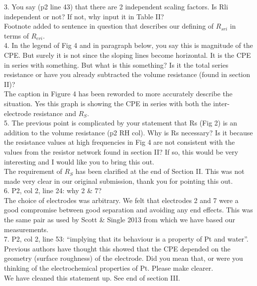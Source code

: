 \documentclass[journal, a4paper]{IEEEtran}
\begin{document}
{3. You say (p2 line 43) that there are 2 independent scaling factors. Is Rli independent or not? If not, why input it in Table II?\\
{\color{OliveGreen}Footnote added to sentence in question that describes our defining of $R_{sri}$ in terms of $R_{eri}$.}\\


4. In the legend of Fig 4 and in paragraph below, you say this is magnitude of the CPE. But surely it is not since the sloping lines become horizontal. It is the CPE in series with something. But what is this something? Is it the total series resistance or have you already subtracted the volume resistance (found in section II)?\\
{\color{OliveGreen}The caption in Figure 4 has been reworded to more accurately describe the situation. Yes this graph is showing the CPE in series with both the inter-electrode resistance and $R_{S}$.}\\


5. The previous point is complicated by your statement that Rs (Fig 2) is an addition to the volume resistance (p2 RH col). Why is Rs necessary? Is it because the resistance values at high frequencies in Fig 4 are not consistent with the values from the resistor network found in section II? If so, this would be very interesting and I would like you to bring this out.\\
{\color{OliveGreen}The requirement of $R_{S}$ has been clarified at the end of Section II. This was not made very clear in our original submission, thank you for pointing this out.}\\


6. P2, col 2, line 24: why 2 \& 7?\\
{\color{OliveGreen}The choice of electrodes was arbitrary. We felt that electrodes 2 and 7 were a good compromise between good separation and avoiding any end effects. This was the same pair as used by Scott \& Single 2013 from which we have based our measurements.}\\


7. P2, col 2, line 53: ``implying that its behaviour is a property of Pt and water''. Previous authors have thought this showed that the CPE depended on the geometry (surface roughness) of the electrode. Did you mean that, or were you thinking of the electrochemical properties of Pt. Please make clearer.\\
{\color{OliveGreen} We have cleaned this statement up. See end of section III.}\\


}
\end{document}
